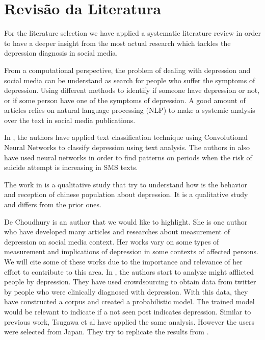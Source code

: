 \chapter{Revisão da Literatura}\label{cap:rev_literatura}

For the literature selection we have applied a systematic literature review in order to have a deeper insight from the most actual research which tackles the depression diagnosis in social media. 

From a computational perspective, the problem of dealing with depression and social media can be understand as search for people who suffer the symptoms of depression. Using different methods to identify if someone have depression or not, or if some person have one of the symptoms of depression. A good amount of articles relies on natural language processing (NLP) to make a systemic analysis over the text in social media publications.

In \cite{Zhao:2018:TCM:3302425.3302501}, the authors have applied text classification technique using Convolutional Neural Networks to classify depression using text analysis. The authors in \cite{Nobles:2018:IIS:3173574.3173987} also have used neural networks in order to find patterns on periods when the risk of suicide attempt is increasing in SMS texts. 

The work in \cite{Li2016} is a qualitative study that try to understand how is the behavior and reception of chinese population about depression. It is a qualitative study and differs from the prior ones.

De Choudhury is an author that we would like to highlight. She is one author who have developed many articles and researches about measurement of depression on social media context. Her works vary on some types of measurement and implications of depression in some contexts of affected persons. We will cite some of these works due to the importance and relevance of her effort to contribute to this area. In \cite{DeChoudhury:2013:SMM:2464464.2464480}, the authors start to analyze might afflicted people by depression. They have used crowdsourcing to obtain data from twitter by people who were clinically diagnosed with depression. With this data, they have constructed a corpus and created a probabilistic model. The trained model would be relevant to indicate if a not seen post indicates depression.
Similar to previous work, Tsugawa et al \cite{Tsugawa2015} have applied the same analysis. However the users were selected from Japan. They try to replicate the results from \cite{DeChoudhury:2013:SMM:2464464.2464480}.

